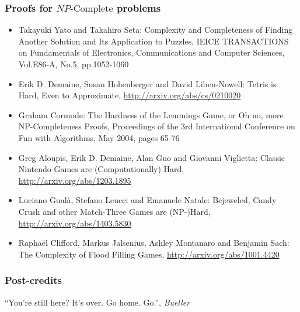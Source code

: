 \documentclass[aspectratio=169]{beamer}
\begin{document}
\begin{frame}
\frametitle{Proofs for $NP\text{-Complete}$ problems}
\begin{itemize}
	\item Takayuki Yato and Takahiro Seta: Complexity and Completeness of Finding Another Solution and Its Application to Puzzles, IEICE TRANSACTIONS on Fundamentals of Electronics, Communications and Computer Sciences, Vol.E86-A, No.5, pp.1052-1060
	\item  Erik D. Demaine, Susan Hohenberger and David Liben-Nowell: Tetris is Hard, Even to Approximate, \url{http://arxiv.org/abs/cs/0210020}
    \item Graham Cormode: The Hardness of the Lemmings Game, or Oh no, more NP-Completeness Proofs, Proceedings of the 3rd International Conference on Fun with Algorithms, May 2004, pages 65-76
    \item Greg Aloupis, Erik D. Demaine, Alan Guo and Giovanni Viglietta: Classic Nintendo Games are (Computationally) Hard, \url{http://arxiv.org/abs/1203.1895}
    \item Luciano Gualà, Stefano Leucci and Emanuele Natale: Bejeweled, Candy Crush and other Match-Three Games are (NP-)Hard, \url{http://arxiv.org/abs/1403.5830}
    \item Rapha\"{e}l Clifford, Markus Jalsenius, Ashley Montanaro and Benjamin Sach:  The Complexity of Flood Filling Games, \url{http://arxiv.org/abs/1001.4420}
\end{itemize}
\end{frame}

\begin{frame}
\frametitle{Post-credits}
\centerline{``You're still here? It's over. Go home. Go.'', {\em Bueller}}
\end{frame}

\end{document}
